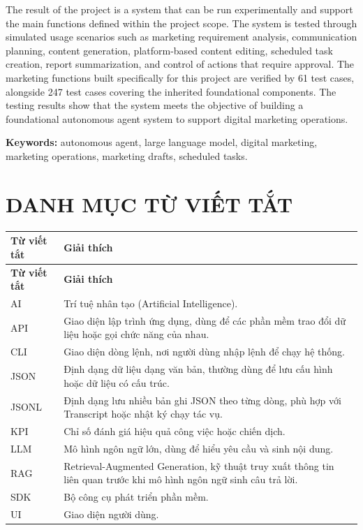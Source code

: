 \documentclass[a4paper]{article}
\newcounter{chapnum}
\renewcommand{\theHtable}{\arabic{chapnum}.\arabic{table}}
\begin{document}
The result of the project is a system that can be run experimentally and support the main functions defined within the project scope. The system is tested through simulated usage scenarios such as marketing requirement analysis, communication planning, content generation, platform-based content editing, scheduled task creation, report summarization, and control of actions that require approval. The marketing functions built specifically for this project are verified by 61 test cases, alongside 247 test cases covering the inherited foundational components. The testing results show that the system meets the objective of building a foundational autonomous agent system to support digital marketing operations.

\textbf{Keywords:} autonomous agent, large language model, digital marketing, marketing operations, marketing drafts, scheduled tasks.


\clearpage
{}
\tableofcontents

\clearpage
{}
\listoffigures

\clearpage
{}
\listoftables

\clearpage

\section*{DANH MỤC TỪ VIẾT TẮT}
\begingroup
\renewcommand{\theHtable}{frontabbr}
\begin{longtable}{L{0.20\textwidth}L{0.70\textwidth}}
\toprule
\textbf{Từ viết tắt} & \textbf{Giải thích}\\
\midrule
\endfirsthead
\toprule
\textbf{Từ viết tắt} & \textbf{Giải thích}\\
\midrule
\endhead
AI & Trí tuệ nhân tạo (Artificial Intelligence).\\
API & Giao diện lập trình ứng dụng, dùng để các phần mềm trao đổi dữ liệu hoặc gọi chức năng của nhau.\\
CLI & Giao diện dòng lệnh, nơi người dùng nhập lệnh để chạy hệ thống.\\
JSON & Định dạng dữ liệu dạng văn bản, thường dùng để lưu cấu hình hoặc dữ liệu có cấu trúc.\\
JSONL & Định dạng lưu nhiều bản ghi JSON theo từng dòng, phù hợp với Transcript hoặc nhật ký chạy tác vụ.\\
KPI & Chỉ số đánh giá hiệu quả công việc hoặc chiến dịch.\\
LLM & Mô hình ngôn ngữ lớn, dùng để hiểu yêu cầu và sinh nội dung.\\
RAG & Retrieval-Augmented Generation, kỹ thuật truy xuất thông tin liên quan trước khi mô hình ngôn ngữ sinh câu trả lời.\\
SDK & Bộ công cụ phát triển phần mềm.\\
UI & Giao diện người dùng.\\
\bottomrule
\end{longtable}
\endgroup
\end{document}

